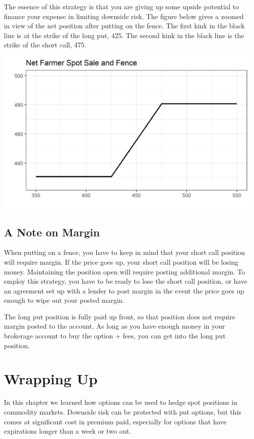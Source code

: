 \documentclass[
  letterpaper,
  DIV=11,
  numbers=noendperiod]{scrreprt}
\begin{document}
The essence of this strategy is that you are giving up some upside
potential to finance your expense in limiting downside risk. The figure
below gives a zoomed in view of the net position after putting on the
fence. The first kink in the black line is at the strike of the long
put, 425. The second kink in the black line is the strike of the short
call, 475.

\includegraphics{assets/Options4-Netspotfence.png}

\hypertarget{a-note-on-margin}{%
\subsection{A Note on Margin}\label{a-note-on-margin}}

When putting on a fence, you have to keep in mind that your short call
position will require margin. If the price goes up, your short call
position will be losing money. Maintaining the position open will
require posting additional margin. To employ this strategy, you have to
be ready to lose the short call position, or have an agreement set up
with a lender to post margin in the event the price goes up enough to
wipe out your posted margin.

The long put position is fully paid up front, so that position does not
require margin posted to the account. As long as you have enough money
in your brokerage account to buy the option + fees, you can get into the
long put position.

\hypertarget{wrapping-up}{%
\section{Wrapping Up}\label{wrapping-up}}

In this chapter we learned how options can be used to hedge spot
positions in commodity markets. Downside risk can be protected with put
options, but this comes at significant cost in premium paid, especially
for options that have expirations longer than a week or two out.
\end{document}
